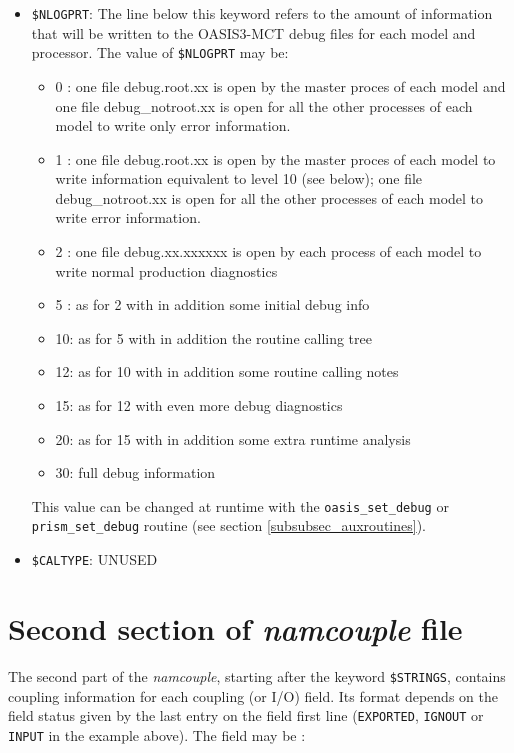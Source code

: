 \begin{itemize}
\item {\tt \$NLOGPRT}: The line below this keyword refers to the
  amount of information that will be written to the OASIS3-MCT debug files
  for each model and processor. The value of {\tt \$NLOGPRT} may be:  
  \begin{itemize}
  \item 0 : one file debug.root.xx is open by the master proces of
    each model and one file debug\_notroot.xx is open for all the
    other processes of each model to write only error information.
  \item 1 : one file debug.root.xx is open by the master proces of each model to write information equivalent to level 10 (see below); one file debug\_notroot.xx is open for all the other processes of each model to write error information.
  \item 2 : one file debug.xx.xxxxxx is open by each process of each model to write normal production diagnostics
  \item 5 : as for 2 with in addition some initial debug info
  \item 10: as for 5 with in addition the routine calling tree
  \item 12: as for 10 with in addition some routine calling notes
  \item 15: as for 12 with even more debug diagnostics
  \item 20: as for 15 with in addition some extra runtime analysis
  \item 30: full debug information
 \end{itemize}
This value can be changed at runtime with the {\tt oasis\_set\_debug}
or {\tt prism\_set\_debug} routine (see section \ref{subsubsec_auxroutines}).

\item {\tt \$CALTYPE}: UNUSED

\end{itemize}


\section{Second section of {\it namcouple} file }
\label{subsec_namcouplesecond}

The second part of the {\it namcouple}, starting after the keyword
{\tt \$STRINGS}, contains coupling information for each coupling (or
I/O) field.  Its format depends on the field status given by the last
entry on the field first line ({\tt EXPORTED}, {\tt IGNOUT} or {\tt
INPUT} in the example above). The field may be :

